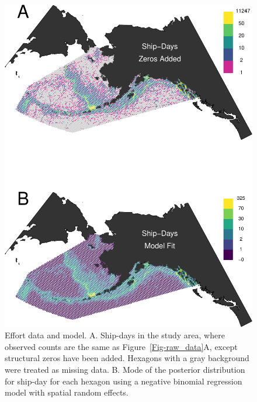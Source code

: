 \documentclass[11pt, titlepage]{article}
\begin{document}
\begin{spacing}{1.9}
\begin{flushleft}
\begin{figure}[H]
  \begin{center}
  \includegraphics[width=.75\linewidth]{figures/Fig-effort-crop}
  \end{center}
  \caption{Effort data and model. A. Ship-days in the study area, where observed counts are the same as Figure~\ref{Fig-raw_data}A, except structural zeros have been added. Hexagons with a gray background were treated as missing data. B. Mode of the posterior distribution for ship-day for each hexagon using a negative binomial regression model with spatial random effects.  \label{Fig-Effort}}         
\end{figure} 


\end{flushleft}
\end{spacing}
\end{document}
